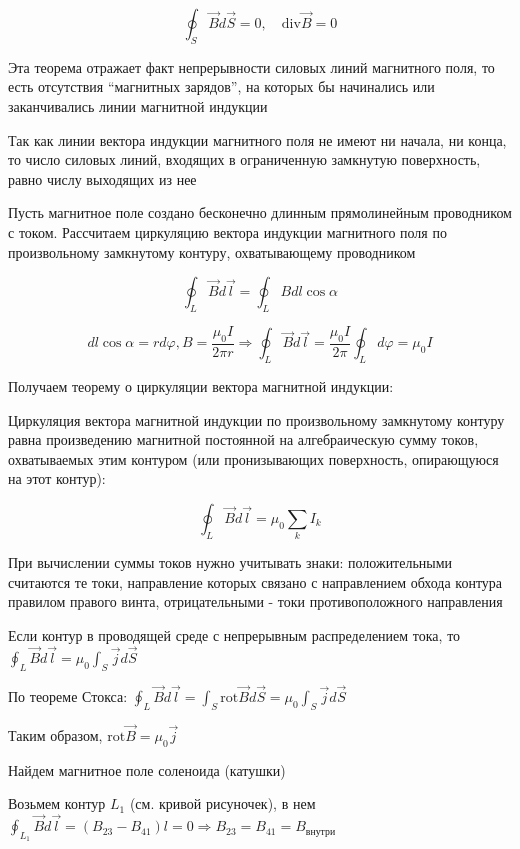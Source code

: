 \documentclass[12pt]{article}
\begin{document}
\[\oint_S \vec{B} d\vec{S} = 0, \quad \mathrm{div}\vec{B} = 0\]

Эта теорема отражает факт непрерывности силовых линий магнитного поля, то есть отсутствия \enquote{магнитных зарядов}, 
на которых бы начинались или заканчивались линии магнитной индукции

Так как линии вектора индукции магнитного поля не имеют ни начала, ни конца, то число силовых линий, входящих в 
ограниченную замкнутую поверхность, равно числу выходящих из нее

Пусть магнитное поле создано бесконечно длинным прямолинейным проводником с током. Рассчитаем циркуляцию вектора
индукции магнитного поля по произвольному замкнутому контуру, охватывающему проводником

\[\oint_L \vec{B} d\vec{l} = \oint_L Bdl \cos\alpha\]

\[dl \cos \alpha = r d\varphi, B = \frac{\mu_0 I}{2\pi r} \Longrightarrow \oint_L \vec{B} d\vec{l} = \frac{\mu_0 I}{2\pi} \oint_L d\varphi = \mu_0 I\]

Получаем теорему о циркуляции вектора магнитной индукции: 

\begin{MyTheorem}
    Циркуляция вектора магнитной индукции по произвольному замкнутому
    контуру равна произведению магнитной постоянной на алгебраическую сумму токов, охватываемых этим контуром (или пронизывающих поверхность, опирающуюся на этот контур):

    \[\oint_L \vec{B} d\vec{l} = \mu_0 \sum_k I_k\]
\end{MyTheorem}

При вычислении суммы токов нужно учитывать знаки: положительными считаются те токи, направление которых связано с направлением обхода
контура правилом правого винта, отрицательными - токи противоположного направления

Если контур в проводящей среде с непрерывным распределением тока, то $\oint_L \vec{B} d\vec{l} = \mu_0 \int_S \vec{j} d\vec{S}$

По теореме Стокса: $\oint_L \vec{B} d\vec{l} = \int_S \mathrm{rot}\vec{B} d\vec{S} = \mu_0 \int_S \vec{j} d\vec{S}$

Таким образом, $\mathrm{rot}\vec{B} = \mu_0 \vec{j}$


\Ex Найдем магнитное поле соленоида (катушки)

Возьмем контур $L_1$ (см. кривой рисуночек), в нем $\oint_{L_1} \vec{B} d\vec{l} = (B_{23} - B_{41})l = 0 \Longrightarrow B_{23} = B_{41} = B_\text{внутри}$
\end{document}
